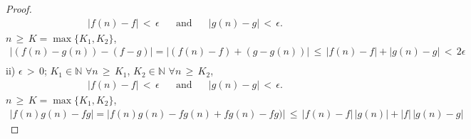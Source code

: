 \begin{theorem}
\begin{proof}
    \begin{align*}
        \lvert f(n) - f \rvert \hspace{2pt} < \hspace{2pt} \epsilon \hspace{20pt} \text{and} \hspace{20pt} \lvert g(n) - g \rvert \hspace{2pt} < \hspace{2pt} \epsilon. 
    \end{align*}
     $n \hspace{2pt} \geq \hspace{2pt} K = \max\{K_{1}, K_{2}\}$,  
    \begin{align*}
        \lvert (f(n) - g(n)) - (f-g) \rvert = \lvert (f(n) - f) + (g - g(n)) \rvert \hspace{2pt} \leq \hspace{2pt} \lvert f(n) - f \rvert + \lvert g(n) - g \rvert \hspace{2pt} < \hspace{2pt} 2\epsilon \\[4ex]
    \end{align*}
    ii)  $\epsilon \hspace{2pt} > \hspace{2pt} 0$;  $K_{1} \in \mathbb{N}$  $\forall n \hspace{2pt} \geq \hspace{2pt} K_{1}$,  $K_{2} \in \mathbb{N}$  $\forall n \hspace{2pt} \geq \hspace{2pt} K_{2}$, 
    \begin{align*}
        \lvert f(n) - f \rvert \hspace{2pt} < \hspace{2pt} \epsilon \hspace{20pt} \text{and} \hspace{20pt} \lvert g(n) - g \rvert \hspace{2pt} < \hspace{2pt} \epsilon. 
    \end{align*}
     $n \hspace{2pt} \geq \hspace{2pt} K = \max\{K_{1}, K_{2}\}$,  
    \begin{align*}
        \lvert f(n)g(n) - fg \rvert = \lvert f(n)g(n) - fg(n) + fg(n) - fg) \rvert \hspace{2pt} \leq \hspace{2pt} \lvert f(n) - f \rvert \hspace{2pt} \lvert g(n) \rvert + \lvert f \rvert \hspace{2pt} \lvert g(n) - g \rvert

\end{align*}
\end{proof}
\end{theorem}
